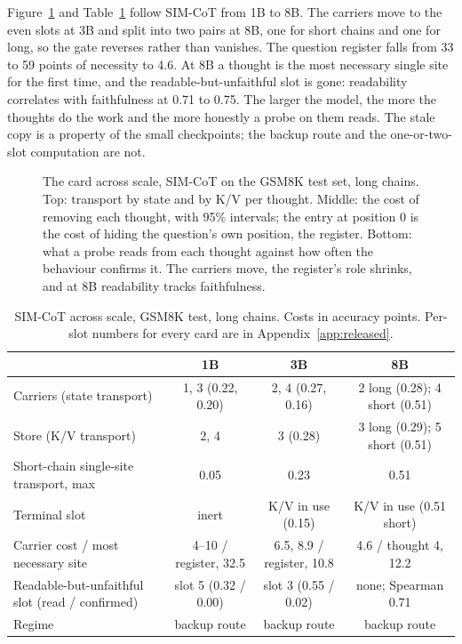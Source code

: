 \documentclass{article}
\begin{document}
Figure~\ref{fig:scale} and Table~\ref{tab:scale} follow SIM-CoT from 1B to 8B. The carriers move to the even slots at 3B and split into two pairs at 8B, one for short chains and one for long, so the gate reverses rather than vanishes. The question register falls from 33 to 59 points of necessity to 4.6. At 8B a thought is the most necessary single site for the first time, and the readable-but-unfaithful slot is gone: readability correlates with faithfulness at 0.71 to 0.75. The larger the model, the more the thoughts do the work and the more honestly a probe on them reads. The stale copy is a property of the small checkpoints; the backup route and the one-or-two-slot computation are not.

\begin{figure}[t]
\centering

\caption{The card across scale, SIM-CoT on the GSM8K test set, long chains. Top: transport by state and by K/V per thought. Middle: the cost of removing each thought, with 95\% intervals; the entry at position 0 is the cost of hiding the question's own position, the register. Bottom: what a probe reads from each thought against how often the behaviour confirms it. The carriers move, the register's role shrinks, and at 8B readability tracks faithfulness.}
\label{fig:scale}
\end{figure}

\begin{table}[h]
\caption{SIM-CoT across scale, GSM8K test, long chains. Costs in accuracy points. Per-slot numbers for every card are in Appendix~\ref{app:released}.}
\label{tab:scale}
\centering\scriptsize
\setlength{\tabcolsep}{3pt}
\begin{tabular}{lccc}
\toprule
 & 1B & 3B & 8B \\
\midrule
Carriers (state transport) & 1, 3 (0.22, 0.20) & 2, 4 (0.27, 0.16) & 2 long (0.28); 4 short (0.51) \\
Store (K/V transport) & 2, 4 & 3 (0.28) & 3 long (0.29); 5 short (0.51) \\
Short-chain single-site transport, max & 0.05 & 0.23 & 0.51 \\
Terminal slot & inert & K/V in use (0.15) & K/V in use (0.51 short) \\
Carrier cost / most necessary site & 4--10 / register, 32.5 & 6.5, 8.9 / register, 10.8 & 4.6 / thought 4, 12.2 \\
Readable-but-unfaithful slot (read / confirmed) & slot 5 (0.32 / 0.00) & slot 3 (0.55 / 0.02) & none; Spearman 0.71 \\
Regime & backup route & backup route & backup route \\
\bottomrule
\end{tabular}
\end{table}
\end{document}
